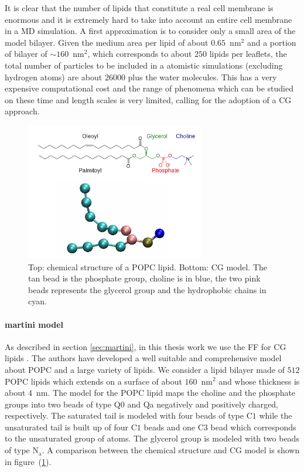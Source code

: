 It is clear that the number of lipids that constitute a real cell membrane is enormous and it is extremely hard to take into account an entire cell membrane in a \ac{MD} simulation. A first approximation is to consider only a small area of the model bilayer. Given the medium area per lipid of about $0.65$~nm$^2$ and a portion of bilayer of $\sim 160$~nm$^2$, which corresponds to about $250$ lipids per leaflets, the total number of particles to be included in a atomistic simulations (excluding hydrogen atoms) are about $26000$ plus the water molecules. This has a very expensive computational cost and the range of phenomena which can be studied on these time and length scales is very limited, calling for the adoption of a \ac{CG} approach.

\begin{figure}[!ht]
	\centering
	\includegraphics[width=0.7\textwidth]{./img/POPC/popc}
	\caption{Top: chemical structure of a \acs{POPC} lipid. Bottom: \martini \acs{CG} model. The tan bead is the phosphate group, choline is in blue, the two pink beads represents the glycerol group and the hydrophobic chains in cyan.}
	\label{fig:popc}
\end{figure}

\paragraph{\textbf{martini model}} As described in section \ref{sec:martini}, in this thesis work we use the \martini \ac{FF} for \ac{CG} lipids \cite{Martini}. The authors have developed a well suitable and comprehensive model about \ac{POPC} and a large variety of lipids. We consider a lipid bilayer made of $512$ \ac{POPC} lipids which extends on a surface of about $160$~nm$^2$ and whose thickness is about $4$~nm. The \martini model for the \ac{POPC} lipid maps the choline and the phosphate groups into two beads of type Q$0$ and Qa negatively and positively charged, respectively. The saturated tail is modeled with four beads of type C$1$ while the unsaturated tail is built up of four C$1$ beads and one C$3$ bead which corresponds to the unsaturated group of atoms. The glycerol group is modeled with two beads of type N$_\text{a}$. A comparison between the chemical structure and \ac{CG} model is shown in figure~(\ref{fig:popc}).


